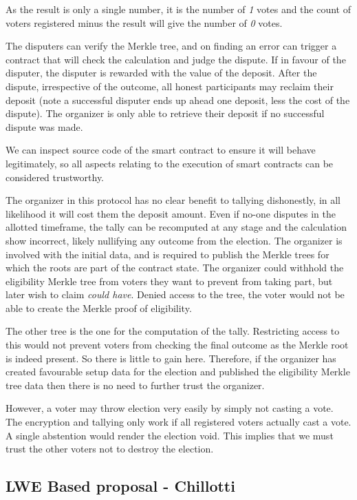 As the result is only a single number, it is the number of \emph{1} votes and the count of voters registered minus the result will give the number of \emph{0} votes.

The disputers can verify the Merkle tree, and on finding an error can trigger a contract that will check the calculation and judge the dispute. If in favour of the disputer, the disputer is rewarded with the value of the deposit. After the dispute, irrespective of the outcome, all honest participants may reclaim their deposit (note a successful disputer ends up ahead one deposit, less the cost of the dispute). The organizer is only able to retrieve their deposit if no successful dispute was made.

We can inspect source code of the smart contract to ensure it will behave legitimately, so all aspects relating to the execution of smart contracts can be considered trustworthy.

The organizer in this protocol has no clear benefit to tallying dishonestly, in all likelihood it will cost them the deposit amount. Even if no-one disputes in the allotted timeframe, the tally can be recomputed at any stage and the calculation show incorrect, likely nullifying any outcome from the election. The organizer is involved with the initial data, and is required to publish the Merkle trees for which the roots are part of the contract state. The organizer could withhold the eligibility Merkle tree from voters they want to prevent from taking part, but later wish to claim \emph{could have}. Denied access to the tree, the voter would not be able to create the Merkle proof of eligibility.

The other tree is the one for the computation of the tally. Restricting access to this would not prevent voters from checking the final outcome as the Merkle root is indeed present. So there is little to gain here. Therefore, if the organizer has created favourable setup data for the election and published the eligibility Merkle tree data then there is no need to further trust the organizer.

However, a voter may throw election very easily by simply not casting a vote. The encryption and tallying only work if all registered voters actually cast a vote. A single abstention would render the election void. This implies that we must trust the other voters not to destroy the election.


\subsection{LWE Based proposal - Chillotti}

